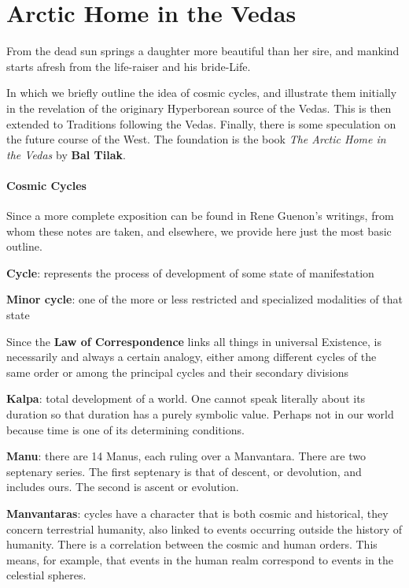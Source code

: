 \section{Arctic Home in the Vedas}

\begin{quotex}
From the dead sun springs a daughter more beautiful than her sire, and mankind starts afresh from the life-raiser and his bride-Life. 

\end{quotex}

In which we briefly outline the idea of cosmic cycles, and illustrate them initially in the revelation of the originary Hyperborean source of the Vedas. This is then extended to Traditions following the Vedas. Finally, there is some speculation on the future course of the West. The foundation is the book \textit{The Arctic Home in the Vedas} by \textbf{Bal Tilak}.

\paragraph{Cosmic Cycles}
Since a more complete exposition can be found in Rene Guenon's writings, from whom these notes are taken, and elsewhere, we provide here just the most basic outline.

\textbf{Cycle}: represents the process of development of some state of manifestation

\textbf{Minor cycle}: one of the more or less restricted and specialized modalities of that state

Since the \textbf{Law of Correspondence} links all things in universal Existence, is necessarily and always a certain analogy, either among different cycles of the same order or among the principal cycles and their secondary divisions

\textbf{Kalpa}: total development of a world. One cannot speak literally about its duration so that duration has a purely symbolic value. Perhaps not in our world because time is one of its determining conditions.

\textbf{Manu}: there are 14 Manus, each ruling over a Manvantara. There are two septenary series. The first septenary is that of descent, or devolution, and includes ours. The second is ascent or evolution.

\textbf{Manvantaras}: cycles have a character that is both cosmic and historical, they concern terrestrial humanity, also linked to events occurring outside the history of humanity. There is a correlation between the cosmic and human orders. This means, for example, that events in the human realm correspond to events in the celestial spheres.

